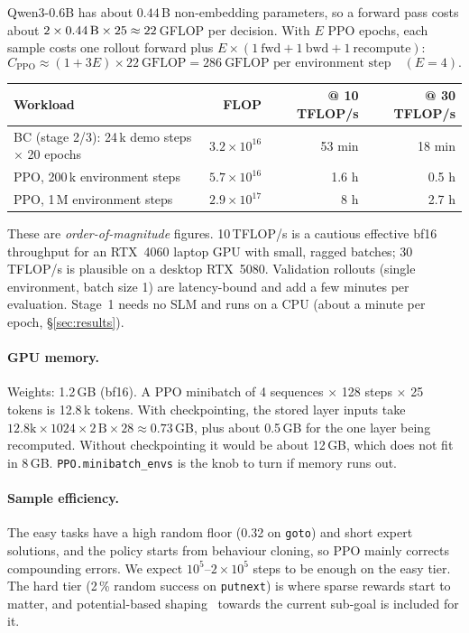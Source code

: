 \documentclass[11pt,a4paper]{article}
\newcommand{\code}[1]{\texttt{\small #1}}
\begin{document}
Qwen3-0.6B has about $0.44$\,B non-embedding parameters, so a forward pass costs about
$2 \times 0.44\text{\,B} \times 25 \approx 22$\,GFLOP per decision. With $E$ PPO epochs, each sample costs one rollout forward plus
$E \times (1\ \text{fwd} + 1\ \text{bwd} + 1\ \text{recompute})$:
\begin{equation}
C_{\text{PPO}} \approx (1 + 3E)\times 22\ \text{GFLOP} = 286\ \text{GFLOP per environment step}\quad (E=4).
\end{equation}
\begin{center}
\small
\begin{tabular}{@{}lrrr@{}}
\toprule
Workload & FLOP & @ 10 TFLOP/s & @ 30 TFLOP/s \\
\midrule
BC (stage 2/3): 24\,k demo steps $\times$ 20 epochs & $3.2\times10^{16}$ & 53 min & 18 min \\
PPO, 200\,k environment steps & $5.7\times10^{16}$ & 1.6 h & 0.5 h \\
PPO, 1\,M environment steps & $2.9\times10^{17}$ & 8 h & 2.7 h \\
\bottomrule
\end{tabular}
\end{center}
These are \emph{order-of-magnitude} figures. 10\,TFLOP/s is a cautious effective bf16 throughput for an RTX~4060 laptop
GPU with small, ragged batches; 30\,TFLOP/s is plausible on a desktop RTX~5080. Validation rollouts (single environment,
batch size 1) are latency-bound and add a few minutes per evaluation. Stage~1 needs no SLM and runs on a CPU (about a minute per epoch, \S\ref{sec:results}).

\paragraph{GPU memory.} Weights: 1.2\,GB (bf16). A PPO minibatch of 4 sequences $\times$ 128 steps $\times$ 25 tokens
is 12.8\,k tokens. With checkpointing, the stored layer inputs take $12.8\text{k} \times 1024 \times 2\,\text{B} \times 28 \approx 0.73$\,GB,
plus about 0.5\,GB for the one layer being recomputed. Without checkpointing it would be about 12\,GB, which does not fit
in 8\,GB. \code{PPO.minibatch\_envs} is the knob to turn if memory runs out.

\paragraph{Sample efficiency.} The easy tasks have a high random floor (0.32 on \code{goto}) and short expert
solutions, and the policy starts from behaviour cloning, so PPO mainly corrects compounding errors. We expect
$10^5$--$2\times10^5$ steps to be enough on the easy tier. The hard tier (2\,\% random success on \code{putnext}) is
where sparse rewards start to matter, and potential-based shaping~\cite{ng1999shaping} towards the current sub-goal is
included for it.
\end{document}
